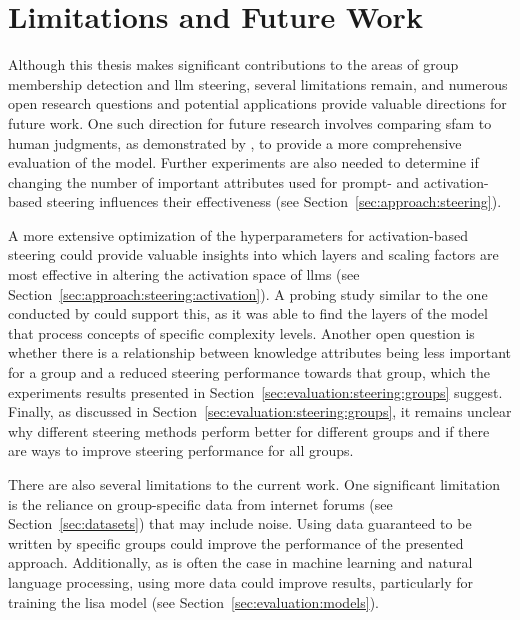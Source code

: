 \section{Limitations and Future Work}
Although this thesis makes significant contributions to the areas of group membership detection and \ac{llm} steering, several limitations remain, and numerous open research questions and potential applications provide valuable directions for future work.
One such direction for future research involves comparing \ac{sfam} to human judgments, as demonstrated by \citet{patelLearningInterpretableStyle2023}, to provide a more comprehensive evaluation of the model. Further experiments are also needed to determine if changing the number of important attributes used for prompt- and activation-based steering influences their effectiveness (see Section~\ref{sec:approach:steering}).

A more extensive optimization of the hyperparameters for activation-based steering could provide valuable insights into which layers and scaling factors are most effective in altering the activation space of \acp{llm} (see Section~\ref{sec:approach:steering:activation}). A probing study similar to the one conducted by \citet{konenStyleVectorsSteering2024} could support this, as it was able to find the layers of the model that process concepts of specific complexity levels. Another open question is whether there is a relationship between knowledge attributes being less important for a group and a reduced steering performance towards that group, which the experiments results presented in Section~\ref{sec:evaluation:steering:groups} suggest. Finally, as discussed in Section~\ref{sec:evaluation:steering:groups}, it remains unclear why different steering methods perform better for different groups and if there are ways to improve steering performance for all groups.

There are also several limitations to the current work. One significant limitation is the reliance on group-specific data from internet forums (see Section~\ref{sec:datasets}) that may include noise. Using data guaranteed to be written by specific groups could improve the performance of the presented approach. Additionally, as is often the case in machine learning and natural language processing, using more data could improve results, particularly for training the \ac{lisa} model (see Section~\ref{sec:evaluation:models}).


